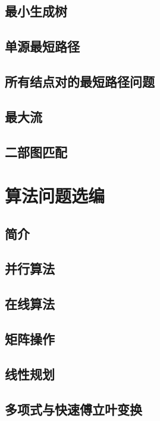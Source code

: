 \documentclass[lang=cn,newtx,10pt,scheme=chinese]{elegantbook}
\begin{document}
\chapter{最小生成树}

\chapter{单源最短路径}

\chapter{所有结点对的最短路径问题}

\chapter{最大流}

\chapter{二部图匹配}

\part{算法问题选编}

\chapter*{简介}

\chapter{并行算法}

\chapter{在线算法}

\chapter{矩阵操作}

\chapter{线性规划}

\chapter{多项式与快速傅立叶变换}
\end{document}
